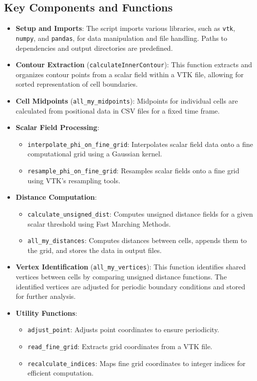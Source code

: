 \documentclass[12pt]{article}
\begin{document}
\subsection{Key Components and Functions}
\begin{itemize}
    \item \textbf{Setup and Imports}: 
    The script imports various libraries, such as \texttt{vtk}, \texttt{numpy}, and \texttt{pandas}, for data manipulation and file handling. Paths to dependencies and output directories are predefined.

    \item \textbf{Contour Extraction} (\texttt{calculateInnerContour}): 
    This function extracts and organizes contour points from a scalar field within a VTK file, allowing for sorted representation of cell boundaries.

    \item \textbf{Cell Midpoints} (\texttt{all\_my\_midpoints}): 
    Midpoints for individual cells are calculated from positional data in CSV files for a fixed time frame.

    \item \textbf{Scalar Field Processing}:
    \begin{itemize}
        \item \texttt{interpolate\_phi\_on\_fine\_grid}: Interpolates scalar field data onto a fine computational grid using a Gaussian kernel.
        \item \texttt{resample\_phi\_on\_fine\_grid}: Resamples scalar fields onto a fine grid using VTK's resampling tools.
    \end{itemize}

    \item \textbf{Distance Computation}:
    \begin{itemize}
        \item \texttt{calculate\_unsigned\_dist}: Computes unsigned distance fields for a given scalar threshold using Fast Marching Methods.
        \item \texttt{all\_my\_distances}: Computes distances between cells, appends them to the grid, and stores the data in output files.
    \end{itemize}

    \item \textbf{Vertex Identification} (\texttt{all\_my\_vertices}):
    This function identifies shared vertices between cells by comparing unsigned distance functions. The identified vertices are adjusted for periodic boundary conditions and stored for further analysis.

    \item \textbf{Utility Functions}:
    \begin{itemize}
        \item \texttt{adjust\_point}: Adjusts point coordinates to ensure periodicity.
        \item \texttt{read\_fine\_grid}: Extracts grid coordinates from a VTK file.
        \item \texttt{recalculate\_indices}: Maps fine grid coordinates to integer indices for efficient computation.
    \end{itemize}
\end{itemize}
\end{document}

